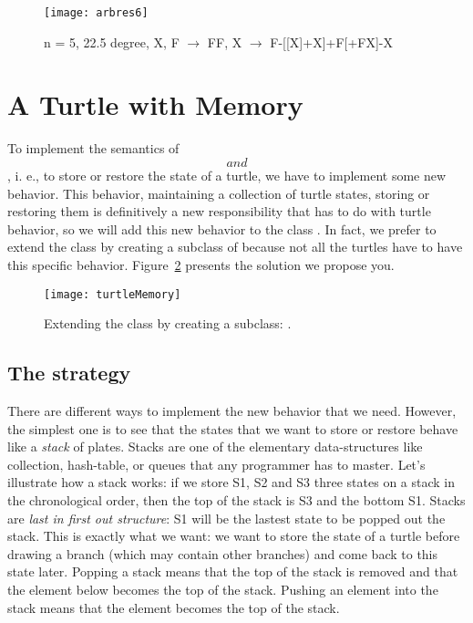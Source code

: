 \begin{figure}
\centerline{\texttt{[image: arbres6]}}
\caption{n = 5, 22.5 degree, X, F $\rightarrow$  FF, X $\rightarrow$ F-[[X]+X]+F[+FX]-X}\label{fig:arbres6}
\end{figure}

\section{A Turtle with Memory}
To implement the semantics of \[ and \], i. e., to store or restore
the state of a turtle, we have to implement some new behavior. This
behavior, maintaining a collection of turtle states, storing or
restoring them is definitively a new responsibility that has to do
with turtle behavior, so we will add this new behavior to the class
.  In fact, we prefer to extend the class  by creating 
a subclass of  because not all the turtles have to have
this specific behavior. Figure~\ref{fig:turtleMemory} presents the
solution we propose you.


\begin{figure}[!htbp]
\centerline{\texttt{[image: turtleMemory]}}
\caption{Extending the  class by creating a subclass: .}
\label{fig:turtleMemory}
\end{figure}


\subsection{The strategy} 

There are different ways to implement the new behavior that we
need. However, the simplest one is to see that the states that we want
to store or restore behave like a \emph{stack} of plates. Stacks are
one of the elementary data-structures like collection, hash-table, or
queues that any programmer has to master.  Let's illustrate how a
stack works: if we store S1, S2 and S3 three states on a stack in the
chronological order, then the top of the stack is S3 and the bottom
S1. Stacks are \emph{last in first out structure}: S1 will be the
lastest state to be popped out the stack. This is exactly what we
want: we want to store the state of a turtle before drawing a branch
(which may contain other branches) and come back to this state later.
Popping a stack means that the top of the stack is removed and that
the element below becomes the top of the stack. Pushing an element
into the stack means that the element becomes the top of the stack.


